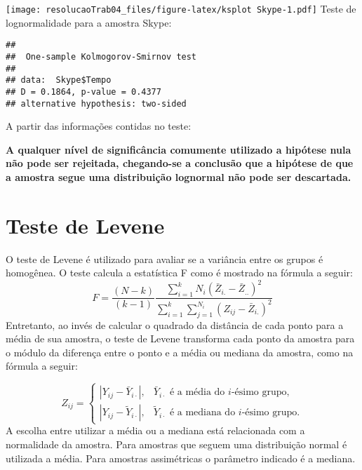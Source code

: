 \documentclass[
]{article}
\newenvironment{Shaded}{\begin{snugshade}}{\end{snugshade}}
\newcommand{\DecValTok}[1]{\textcolor[rgb]{0.00,0.00,0.81}{#1}}
\newcommand{\KeywordTok}[1]{\textcolor[rgb]{0.13,0.29,0.53}{\textbf{#1}}}
\newcommand{\NormalTok}[1]{#1}
\newcommand{\OperatorTok}[1]{\textcolor[rgb]{0.81,0.36,0.00}{\textbf{#1}}}
\newcommand{\StringTok}[1]{\textcolor[rgb]{0.31,0.60,0.02}{#1}}
\begin{document}
\texttt{[image: resolucaoTrab04\_files/figure-latex/ksplot Skype-1.pdf]}
Teste de lognormalidade para a amostra Skype:

\begin{Shaded}
\end{Shaded}

\begin{verbatim}
## 
##  One-sample Kolmogorov-Smirnov test
## 
## data:  Skype$Tempo
## D = 0.1864, p-value = 0.4377
## alternative hypothesis: two-sided
\end{verbatim}

A partir das informações contidas no teste:

\textbf{A qualquer nível de significância comumente utilizado a hipótese
nula não pode ser rejeitada, chegando-se a conclusão que a hipótese de
que a amostra segue uma distribuição lognormal não pode ser descartada.}

\hypertarget{teste-de-levene}{%
\section{Teste de Levene}\label{teste-de-levene}}

O teste de Levene é utilizado para avaliar se a variância entre os
grupos é homogênea. O teste calcula a estatística F como é mostrado na
fórmula a seguir: \[
F = \frac{(N-k)} {(k-1)}
               \frac{\sum_{i=1}^{k}N_{i}(\bar{Z}_{i.}-\bar{Z}_{..})^{2} }
               {\sum_{i=1}^{k}\sum_{j=1}^{N_i}(Z_{ij}-\bar{Z}_{i.})^{2} }
\] Entretanto, ao invés de calcular o quadrado da distância de cada
ponto para a média de sua amostra, o teste de Levene transforma cada
ponto da amostra para o módulo da diferença entre o ponto e a média ou
mediana da amostra, como na fórmula a seguir:

\[{\displaystyle Z_{ij}={\begin{cases}|Y_{ij}-{\bar {Y}}_{i\cdot }|,&{\bar {Y}}_{i\cdot }{\text{ é a média do }}i{\text{-ésimo grupo}},\\|Y_{ij}-{\tilde {Y}}_{i\cdot }|,&{\tilde {Y}}_{i\cdot }{\text{ é a mediana do }}i{\text{-ésimo grupo}}.\end{cases}}}\]
A escolha entre utilizar a média ou a mediana está relacionada com a
normalidade da amostra. Para amostras que seguem uma distribuição normal
é utilizada a média. Para amostras assimétricas o parâmetro indicado é a
mediana.
\end{document}
